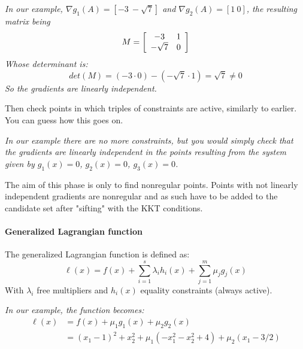 \textit{In our example, $\nabla g_1 (A) = \left[- 3 \ -\sqrt{7}\right]$ and $\nabla g_2 (A) = \left[1 \ 0 \right]$, the resulting matrix being
$$
M = \left[\begin{array}{c c}
	-3 & 1 \\ -\sqrt{7} & 0
\end{array} \right]
$$
Whose determinant is: 
$$ det(M) = (-3 \cdot 0) - (-\sqrt{7} \cdot 1) = \sqrt{7} \neq 0$$
So the gradients are linearly independent.}

Then check points in which triples of constraints are active, similarly to earlier. You can guess how this goes on.

\textit{In our example there are no more constraints, but you would simply check that the gradients are linearly independent in the points resulting from the system given by $g_1(x) = 0$, $g_2(x) = 0$, $g_3(x) = 0$.}

The aim of this phase is only to find nonregular points. Points with not linearly independent gradients are nonregular and as such have to be added to the candidate set after "sifting" with the KKT conditions.

\paragraph{Generalized Lagrangian function} The generalized Lagrangian function is defined as:
$$ \ell (x) = f(x) + \sum_{i = 1}^s \lambda_i h_i (x) + \sum_{j = 1}^m \mu_j g_j (x) $$
With $\lambda_i$ free multipliers and $h_i (x)$ equality constraints (always active).

\textit{In our example, the function becomes:
\begin{align*}
	\ell (x) & = f(x) + \mu_1 g_1 (x) + \mu_2 g_2 (x) \\
	& = (x_1 - 1)^2 + x_2^2 + \mu_1\left(-x_1^2 - x_2^2 + 4\right) + \mu_2 (x_1 - 3/2)
\end{align*}
}

